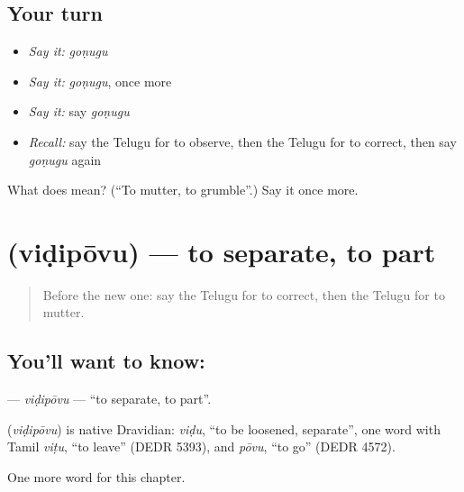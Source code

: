 \subsection*{Your turn}
\begin{itemize}
\raggedright
  \item \emph{Say it:} \emph{goṇugu}
  \item \emph{Say it:} \emph{goṇugu}, once more
  \item \emph{Say it:} say \emph{goṇugu}
  \item \emph{Recall:} say the Telugu for to observe, then the Telugu for to correct, then say \emph{goṇugu} again
\end{itemize}

\begin{tcolorbox}[breakable,colback=teal!4,colframe=teal!35!black,title={Before you move on}]
What does  mean? (\textquotedblleft{}To mutter, to grumble\textquotedblright{}.) Say it once more.
\end{tcolorbox}
\section[\texorpdfstring{\te{విడిపోవు} (viḍipōvu)}{విడిపోవు (viḍipōvu)}]{ (viḍipōvu) — to separate, to part}

\label{lesson:TE-C166-vidipovu}



\begin{quote}
Before the new one: say the Telugu for to correct, then the Telugu for to mutter.
\end{quote}

\subsection*{You'll want to know: }
\textbf{} — \emph{viḍipōvu} — \textquotedblleft{}to separate, to part\textquotedblright{}.

\begin{cousinweb}
\textbf{} (\emph{viḍipōvu}) is native Dravidian: \emph{viḍu}, \textquotedblleft{}to be loosened, separate\textquotedblright{}, one word with Tamil \emph{viṭu}, \textquotedblleft{}to leave\textquotedblright{} (DEDR 5393), and \emph{pōvu}, \textquotedblleft{}to go\textquotedblright{} (DEDR 4572).
\end{cousinweb}

\begin{grammarlens}[title={What you've built}]
One more word for this chapter.
\end{grammarlens}

